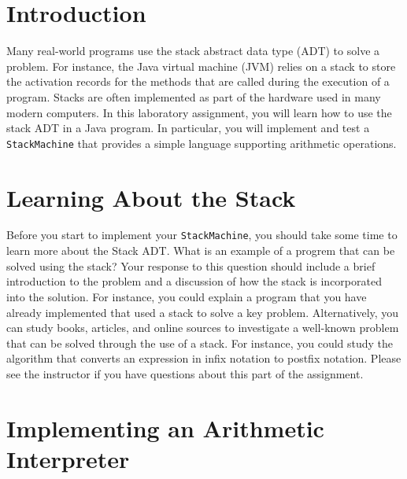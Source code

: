 


\usepackage[compact]{titlesec}


\section*{Introduction}

  Many real-world programs use the stack abstract data type (ADT) to solve a problem.  For instance, the Java virtual
  machine (JVM) relies on a stack to store the activation records for the methods that are called during the execution
  of a program.  Stacks are often implemented as part of the hardware used in many modern computers. In this laboratory
  assignment, you will learn how to use the stack ADT in a Java program.  In particular, you will implement and test a
  {\tt StackMachine} that provides a simple language supporting arithmetic operations.

\section*{Learning About the Stack}

  Before you start to implement your {\tt StackMachine}, you should take some time to learn more about the Stack ADT.
  What is an example of a progrem that can be solved using the stack? Your response to this question should include a
  brief introduction to the problem and a discussion of how the stack is incorporated into the solution. For instance,
  you could explain a program that you have already implemented that used a stack to solve a key problem. Alternatively,
  you can study books, articles, and online sources to investigate a well-known problem that can be solved through the
  use of a stack.  For instance, you could study the algorithm that converts an expression in infix notation to postfix
  notation. Please see the instructor if you have questions about this part of the assignment.

\section*{Implementing an Arithmetic Interpreter}
  
